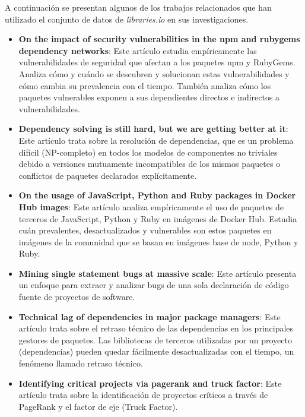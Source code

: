 A continuación se presentan algunos de los trabajos relacionados que han utilizado el conjunto de
datos de \textit{libraries.io} en sus investigaciones.
\begin{itemize}
    \item \textbf{On the impact of security vulnerabilities in the npm and rubygems dependency networks}\cite{zerouali2022impact}:
          Este artículo estudia empíricamente las vulnerabilidades de seguridad que afectan a los paquetes npm y RubyGems.
          Analiza cómo y cuándo se descubren y solucionan estas vulnerabilidades y cómo cambia su prevalencia con el tiempo.
          También analiza cómo los paquetes vulnerables exponen a sus dependientes directos e indirectos a vulnerabilidades.
    \item \textbf{Dependency solving is still hard, but we are getting better at it}\cite{abate2020dependency}:
          Este artículo trata sobre la resolución de dependencias, que es un problema difícil (NP-completo) en todos los modelos
          de componentes no triviales debido a versiones mutuamente incompatibles de los mismos paquetes o conflictos de
          paquetes declarados explícitamente.
    \item \textbf{On the usage of JavaScript, Python and Ruby packages in Docker Hub images}\cite{zerouali2021usage}:
          Este artículo analiza empíricamente el uso de paquetes de terceros de JavaScript, Python y Ruby en imágenes de Docker Hub.
          Estudia cuán prevalentes, desactualizados y vulnerables son estos paquetes en imágenes de la comunidad que se basan en
          imágenes base de node, Python y Ruby.
    \item \textbf{Mining single statement bugs at massive scale}\cite{richter2022tssb}:
          Este artículo presenta un enfoque para extraer y analizar bugs de una sola declaración de código fuente de proyectos
          de software.
    \item \textbf{Technical lag of dependencies in major package managers}\cite{stringer2020technical}:
          Este artículo trata sobre el retraso técnico de las dependencias en los principales gestores de paquetes.
          Las bibliotecas de terceros utilizadas por un proyecto (dependencias) pueden quedar fácilmente desactualizadas con el
          tiempo, un fenómeno llamado retraso técnico.
    \item \textbf{Identifying critical projects via pagerank and truck factor}\cite{pfeiffer2021identifying}:
          Este artículo trata sobre la identificación de proyectos críticos a través de PageRank y el factor de eje (Truck Factor).

\end{itemize}
